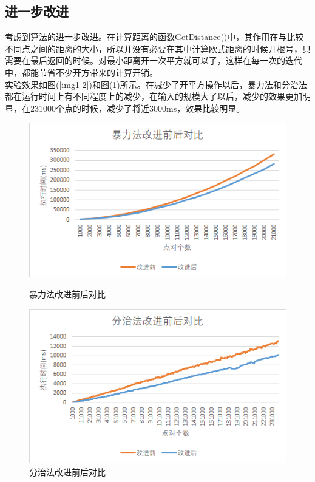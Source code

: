 \documentclass[UTF8]{ctexart}
\begin{document}
\subsection{进一步改进}

考虑到算法的进一步改进。在计算距离的函数GetDistance()中，其作用在与比较不同点之间的距离的大小，所以并没有必要在其中计算欧式距离的时候开根号，只需要在最后返回的时候。对最小距离开一次平方就可以了，这样在每一次的迭代中，都能节省不少开方带来的计算开销。\\
实验效果如图(\ref{img1-2})和图(\ref{img1-3})所示。在减少了开平方操作以后，暴力法和分治法都在运行时间上有不同程度上的减少，在输入的规模大了以后，减少的效果更加明显，在231000个点的时候，减少了将近3000ms，效果比较明显。

\begin{figure}[htbp]

    \begin{minipage}[t]{0.5\textwidth} %
        
    \centering
    \includegraphics[width=\textwidth]{img/1-2.png}
    \caption{暴力法改进前后对比}%
    \label{img1-2}
    \end{minipage}
    \begin{minipage}[t]{0.5\textwidth}
    \centering
    \includegraphics[width=\textwidth]{img/1-3.png}
    \caption{分治法改进前后对比}
    \label{img1-3}
    \end{minipage}
       
\end{figure}
\end{document}
